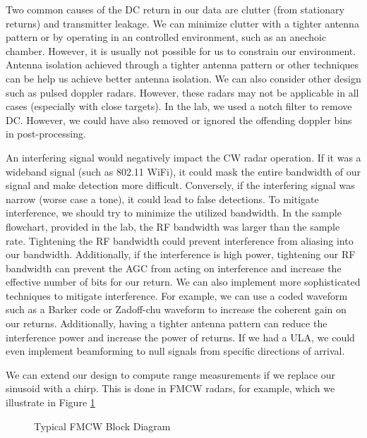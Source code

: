 \documentclass{article}
\begin{document}
Two common causes of the DC return in our data are clutter (from stationary returns) and transmitter leakage. We can minimize clutter with a tighter antenna pattern or by operating in an controlled environment, such as an anechoic chamber. However, it is usually not possible for us to constrain our environment. Antenna isolation achieved through a tighter antenna pattern or other techniques can be help us achieve better antenna isolation. We can also consider other design such as pulsed doppler radars. However, these radars may not be applicable in all cases (especially with close targets). In the lab, we used a notch filter to remove DC. However, we could have also removed or ignored the offending doppler bins in post-processing.

An interfering signal would negatively impact the CW radar operation. If it was a wideband signal (such as 802.11 WiFi), it could mask the entire bandwidth of our signal and make detection more difficult. Conversely, if the interfering signal was narrow (worse case a tone), it could lead to false detections. To mitigate interference, we should try to minimize the utilized bandwidth. In the sample flowchart, provided in the lab, the RF bandwidth was larger than the sample rate. Tightening the RF bandwidth could prevent interference from aliasing into our bandwidth. Additionally, if the interference is high power, tightening our RF bandwidth can prevent the AGC from acting on interference and increase the effective number of bits for our return. We can also implement more sophisticated techniques to mitigate interference. For example, we can use a coded waveform such as a Barker code or Zadoff-chu waveform to increase the coherent gain on our returns. Additionally, having a tighter antenna pattern can reduce the interference power and increase the power of returns. If we had a ULA, we could even implement beamforming to null signals from specific directions of arrival.

We can extend our design to compute range measurements if we replace our sinusoid with a chirp. This is done in FMCW radars, for example, which we illustrate in Figure \ref{fig::fmcw_radar}

\begin{figure}[H]
    	\centering
    	\caption{Typical FMCW Block Diagram \cite{9613183}}
    	\label{fig::fmcw_radar}
\end{figure}
	
\end{document}
